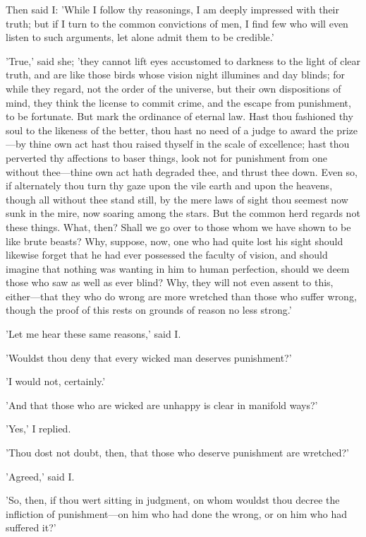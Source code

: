 Then said I: 'While I follow thy reasonings, I am deeply impressed with
their truth; but if I turn to the common convictions of men, I find few
who will even listen to such arguments, let alone admit them to be
credible.'

'True,' said she; 'they cannot lift eyes accustomed to darkness to the
light of clear truth, and are like those birds whose vision night
illumines and day blinds; for while they regard, not the order of the
universe, but their own dispositions of mind, they think the license to
commit crime, and the escape from punishment, to be fortunate. But mark
the ordinance of eternal law. Hast thou fashioned thy soul to the
likeness of the better, thou hast no need of a judge to award the
prize—by thine own act hast thou raised thyself in the scale of
excellence; hast thou perverted thy affections to baser things, look not
for punishment from one without thee—thine own act hath degraded thee,
and thrust thee down. Even so, if alternately thou turn thy gaze upon
the vile earth and upon the heavens, though all without thee stand
still, by the mere laws of sight thou seemest now sunk in the mire, now
soaring among the stars. But the common herd regards not these things.
What, then? Shall we go over to those whom we have shown to be like
brute beasts? Why, suppose, now, one who had quite lost his sight
should likewise forget that he had ever possessed the faculty of vision,
and should imagine that nothing was wanting in him to human perfection,
should we deem those who saw as well as ever blind? Why, they will not
even assent to this, either—that they who do wrong are more wretched
than those who suffer wrong, though the proof of this rests on grounds
of reason no less strong.'

'Let me hear these same reasons,' said I.

'Wouldst thou deny that every wicked man deserves punishment?'

'I would not, certainly.'

'And that those who are wicked are unhappy is clear in manifold ways?'

'Yes,' I replied.

'Thou dost not doubt, then, that those who deserve punishment are
wretched?'

'Agreed,' said I.

'So, then, if thou wert sitting in judgment, on whom wouldst thou decree
the infliction of punishment—on him who had done the wrong, or on him
who had suffered it?'

